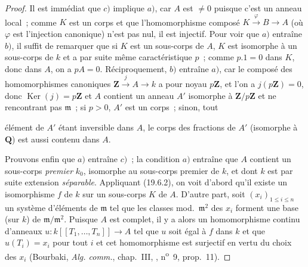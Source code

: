\begin{proof}
Il est immédiat que $c)$ implique $a)$, car $A$ est $\neq0$ puisque c'est un
anneau local~; comme $K$ est un corps et que l'homomorphisme composé
$K\xrightarrow{\varphi}B\to A$ (où $\varphi$ est l'injection canonique) n'est
pas nul, il est injectif. Pour voir que $a)$ entraîne $b)$, il suffit de
remarquer que si $K$ est un sous-corps de $A$, $K$ est isomorphe à un
sous-corps de $k$ et a par suite même caractéristique $p$~; comme $p.1=0$ dans
$K$, donc dans $A$, on a $pA=0$. Réciproquement, $b)$ entraîne $a)$, car le
composé des homomorphismes canoniques
$\mathbf Z\xrightarrow{j}A\to k$ a pour noyau $p\mathbf Z$, et l'on a
$j(p\mathbf Z)=0$, donc $\operatorname{Ker}(j)=p\mathbf Z$ et $A$ contient un
anneau $A'$ isomorphe à $\mathbf Z/p\mathbf Z$ et ne rencontrant pas
$\mathfrak m$~; si $p>0$, $A'$ est un corps~; sinon, tout


élément de $A'$ étant inversible dans $A$, le corps des fractions de $A'$
(isomorphe à $\mathbf Q$) est aussi contenu dans $A$.

Prouvons enfin que $a)$ entraîne $c)$~; la condition $a)$ entraîne que $A$
contient un sous-corps \emph{premier} $k_0$, isomorphe au sous-corps premier de $k$,
et dont $k$ est par suite extension \emph{séparable}. Appliquant (19.6.2), on voit
d'abord qu'il existe un isomorphisme $f$ de $k$ sur un sous-corps $K$ de $A$.
D'autre part, soit $(x_i)_{1\leq i\leq n}$ un système d'éléments de
$\mathfrak m$ tel que les classes mod.~$\mathfrak m^2$ des $x_i$ forment une
base (sur $k$) de $\mathfrak m/\mathfrak m^2$. Puisque $A$ est complet, il y a
alors un homomorphisme continu d'anneaux
$u:k[[T_1,\ldots,T_n]]\to A$ tel que $u$ soit égal à $f$ dans $k$ et que
$u(T_i)=x_i$ pour tout $i$ et cet homomorphisme est surjectif en vertu du
choix des $x_i$ (Bourbaki, \emph{Alg. comm.}, chap.~III, ,
n\textsuperscript{o}~9, prop.~11).
\end{proof}

